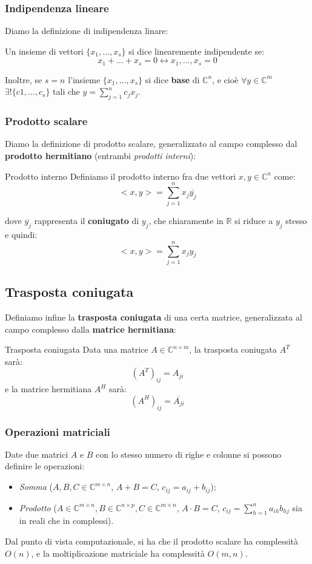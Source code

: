 \documentclass[a4paper,11pt]{article}
\begin{document}
\subsubsection{Indipendenza lineare}
Diamo la definizione di indipendenza linare:
\begin{definition}{}
	Un insieme di vettori $\{x_1, ..., x_s\}$ si dice linearemente indipendente se:
	$$
		x_1 + ... + x_s = 0 \leftrightarrow x_1, ..., x_s = 0
	$$
\end{definition}

Inoltre, se $s = n$ l'insieme $\{ x_1, ...,x_s \}$ si dice \textbf{base} di $\mathbb{C}^n$, e cioè $\forall y \in \mathbb{C}^m$ $\exists ! \{c1, ..., c_s\}$ tali che $y = \sum_{j=1}^n c_j x_j$.

\subsubsection{Prodotto scalare}
Diamo la definizione di prodotto scalare, generalizzato al campo complesso dal \textbf{prodotto hermitiano} (entrambi \textit{prodotti interni}):
\begin{definition}{Prodotto interno}
	Definiamo il prodotto interno fra due vettori $x, y \in \mathbb{C}^n$ come:
	$$
	<x, y> = \sum_{j = 1}^n x_j \overline{y_j}
	$$
\end{definition}
dove $\overline{y_j}$ rappresenta il \textbf{coniugato} di $y_j$, che chiaramente in $\mathbb{R}$ si riduce a $y_j$ stesso e quindi:
	$$
	<x, y> = \sum_{j = 1}^n x_j y_j
	$$ 

\subsection{Trasposta coniugata}
Definiamo infine la \textbf{trasposta coniugata} di una certa matrice, generalizzata al campo complesso dalla \textbf{matrice hermitiana}:
\begin{definition}{Trasposta coniugata}
	Data una matrice $A \in \mathbb{C}^{n \times m}$, la trasposta coniugata $A^T$ sarà:
	$$
		(A^T)_{ij} = A_{ji}
	$$
	e la matrice hermitiana $A^H$ sarà: 
	$$
		(A^H)_{ij} = \overline{A_{ji}}
	$$
\end{definition}

\subsubsection{Operazioni matriciali}
Date due matrici $A$ e $B$ con lo stesso numero di righe e colonne si possono definire le operazioni:
\begin{itemize}
	\item \textit{Somma} ($A, B, C \in \mathbb{C}^{m \times n}$, $A + B = C$, $c_{ij} = a_{ij} + b_{ij}$);
	\item \textit{Prodotto} ($A \in \mathbb{C}^{m \times n}, B \in \mathbb{C}^{n \times p}, C \in \mathbb{C}^{m \times n}$, $A \cdot B = C$, $c_{ij} = \sum_{h = 1}^n a_{ih} b_{hj}$ sia in reali che in complessi). 
\end{itemize}

\par\smallskip

Dal punto di vista computazionale, si ha che il prodotto scalare ha complessità $O(n)$, e la moltiplicazione matriciale ha complessità $O(m, n)$.
\end{document}
